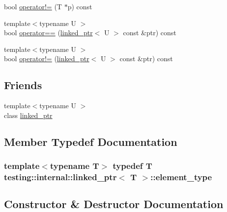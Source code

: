 \begin{DoxyCompactItemize}
\item 
bool \hyperlink{classtesting_1_1internal_1_1linked__ptr_a3685f9661bbe410cfa58fea2f14396b7}{operator!=} (T $\ast$p) const 
\item 
{\footnotesize template$<$typename U $>$ }\\bool \hyperlink{classtesting_1_1internal_1_1linked__ptr_a3b46c9ecfd928673a524dcb3c70fd2ad}{operator==} (\hyperlink{classtesting_1_1internal_1_1linked__ptr}{linked\+\_\+ptr}$<$ U $>$ const \&ptr) const 
\item 
{\footnotesize template$<$typename U $>$ }\\bool \hyperlink{classtesting_1_1internal_1_1linked__ptr_a6449584b90a09a313300599fb3a23633}{operator!=} (\hyperlink{classtesting_1_1internal_1_1linked__ptr}{linked\+\_\+ptr}$<$ U $>$ const \&ptr) const 
\end{DoxyCompactItemize}
\subsection*{Friends}
\begin{DoxyCompactItemize}
\item 
{\footnotesize template$<$typename U $>$ }\\class \hyperlink{classtesting_1_1internal_1_1linked__ptr_a7763f286ca03a7f7363a033d996c8c1c}{linked\+\_\+ptr}
\end{DoxyCompactItemize}


\subsection{Member Typedef Documentation}
\hypertarget{classtesting_1_1internal_1_1linked__ptr_a295c7d1ee4100d916514c4e4385a0063}{}
\subsubsection[{element\+\_\+type}]{\setlength{\rightskip}{0pt plus 5cm}template$<$typename T$>$ typedef T {\bf testing\+::internal\+::linked\+\_\+ptr}$<$ T $>$\+::{\bf element\+\_\+type}}\label{classtesting_1_1internal_1_1linked__ptr_a295c7d1ee4100d916514c4e4385a0063}


\subsection{Constructor \& Destructor Documentation}
\hypertarget{classtesting_1_1internal_1_1linked__ptr_ae805418b9f03f14ff49649e710475dba}{}
